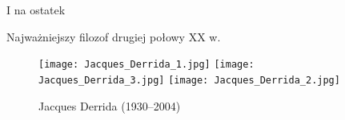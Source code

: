 \documentclass{beamer}  %
\begin{document}
\begin{frame}{I na ostatek}
  \begin{block}{Najważniejszy filozof drugiej połowy XX w.}
    \pause
    \begin{figure}
      \centering

      \texttt{[image: Jacques\_Derrida\_1.jpg]}
      \texttt{[image: Jacques\_Derrida\_3.jpg]}
      \texttt{[image: Jacques\_Derrida\_2.jpg]}
      \caption{Jacques Derrida (1930--2004)}
    \end{figure}
  \end{block}
\end{frame}





 {}



\end{document}
